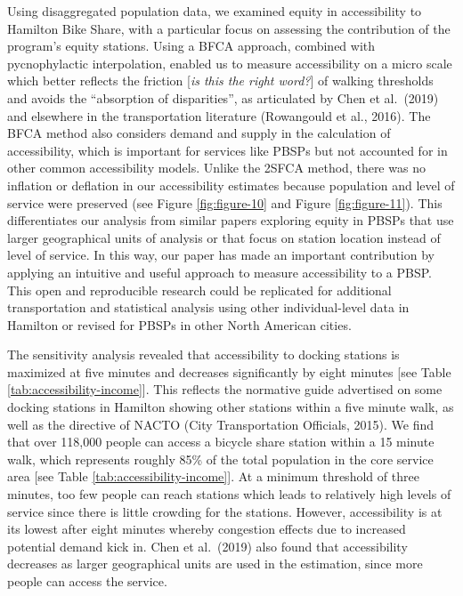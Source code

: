 \documentclass[]{elsarticle} %
\begin{document}
Using disaggregated population data, we examined equity in accessibility
to Hamilton Bike Share, with a particular focus on assessing the
contribution of the program's equity stations. Using a BFCA approach,
combined with pycnophylactic interpolation, enabled us to measure
accessibility on a micro scale which better reflects the friction
{[}\emph{is this the right word?}{]} of walking thresholds and avoids
the ``absorption of disparities'', as articulated by Chen et al.~(2019)
and elsewhere in the transportation literature (Rowangould et al.,
2016). The BFCA method also considers demand and supply in the
calculation of accessibility, which is important for services like PBSPs
but not accounted for in other common accessibility models. Unlike the
2SFCA method, there was no inflation or deflation in our accessibility
estimates because population and level of service were preserved (see
Figure \ref{fig:figure-10} and Figure \ref{fig:figure-11}). This
differentiates our analysis from similar papers exploring equity in
PBSPs that use larger geographical units of analysis or that focus on
station location instead of level of service. In this way, our paper has
made an important contribution by applying an intuitive and useful
approach to measure accessibility to a PBSP. This open and reproducible
research could be replicated for additional transportation and
statistical analysis using other individual-level data in Hamilton or
revised for PBSPs in other North American cities.

The sensitivity analysis revealed that accessibility to docking stations
is maximized at five minutes and decreases significantly by eight
minutes {[}see Table \ref{tab:accessibility-income}{]}. This reflects
the normative guide advertised on some docking stations in Hamilton
showing other stations within a five minute walk, as well as the
directive of NACTO (City Transportation Officials, 2015). We find that
over 118,000 people can access a bicycle share station within a 15
minute walk, which represents roughly 85\% of the total population in
the core service area {[}see Table \ref{tab:accessibility-income}{]}. At
a minimum threshold of three minutes, too few people can reach stations
which leads to relatively high levels of service since there is little
crowding for the stations. However, accessibility is at its lowest after
eight minutes whereby congestion effects due to increased potential
demand kick in. Chen et al.~(2019) also found that accessibility
decreases as larger geographical units are used in the estimation, since
more people can access the service.
\end{document}
